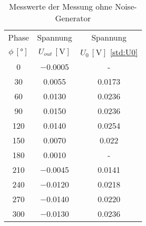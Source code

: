 \begin{table}[!h]
	\centering
	\begin{tabular}{|c|c|c|}
		\hline
		Phase & Spannung & Spannung\\
		$\phi\,[\si{\degree}]$ & $U_{out}\,[\si{\volt}]$ & $U_{0}\,[\si{\volt}]$ \cref{std:U0} \\\hline\hline
		\num{0}  & \num{-0.0005}  & - \\
		\num{30}  & \num{0.0055}  & \num{0.0173} \\
		\num{60}  & \num{0.0130}  & \num{0.0236} \\
		\num{90}  & \num{0.0150}  & \num{0.0236} \\
		\num{120}  & \num{0.0140}  & \num{0.0254} \\
		\num{150}  & \num{0.0070}  & \num{0.022} \\
		\num{180}  & \num{0.0010}  & - \\
		\num{210}  & \num{-0.0045}  & \num{0.0141} \\
		\num{240}  & \num{-0.0120}  & \num{0.0218} \\
		\num{270}  & \num{-0.0140}  & \num{0.0220} \\
		\num{300}  & \num{-0.0130}  & \num{0.0236} \\
		\hline
	\end{tabular}
	\caption{Messwerte der Messung ohne Noise-Generator \label{tab:ohneNoise}}
\end{table}

